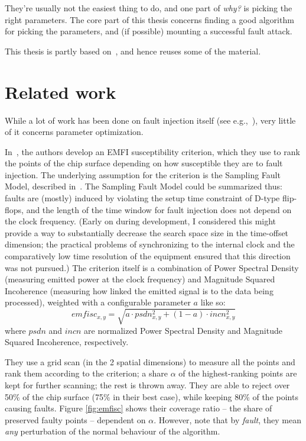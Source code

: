\documentclass[times, utf8, diplomski]{fer}
\begin{document}
They're usually not the easiest thing to do, and one part of \emph{why?} is
picking the right parameters. The core part of this thesis concerns finding
a good algorithm for picking the parameters, and (if possible) mounting a
successful fault attack.


This thesis is partly based on~\cite{paper_FDTC2018}, and hence reuses some
of the material.


\section{Related work}\label{sec:related_work}
While a lot of work has been done on fault injection itself (see
e.g.,~\cite{Kommerling, boneh_demillo_lipton, nsamwel_africacrypt, impeccable_circuits, FI_crowbars}),
very little of it concerns parameter optimization.

In~\cite{madau2017fault}, the authors develop an EMFI susceptibility criterion,
which they use to rank the points of the chip surface depending on how susceptible
they are to fault injection. The underlying assumption for the criterion is the
Sampling Fault Model, described in~\cite{ordas2015injection}. The Sampling Fault
Model could be summarized thus: faults are (mostly) induced by violating the
setup time constraint of D-type flip-flops, and the length of the time window
for fault injection does not depend on the clock frequency. (Early on during
development, I considered this might provide a way to substantially decrease
the search space size in the time-offset dimension; the practical problems of
synchronizing to the internal clock and the comparatively low time resolution
of the equipment ensured that this direction was not pursued.) The criterion
itself is a combination of Power Spectral Density (measuring emitted power at
the clock frequency) and Magnitude Squared Incoherence (measuring how linked
the emitted signal is to the data being processed), weighted with a configurable
parameter $a$ like so:
\[
    emfisc_{x,y} = \sqrt{a \cdot psdn_{x,y}^2   +   (1-a) \cdot incn_{x,y}^2}
\]
where $psdn$ and $incn$ are normalized Power Spectral Density and Magnitude
Squared Incoherence, respectively.


They use a grid scan (in the 2 spatial dimensions) to measure all the points
and rank them according to the criterion; a share $\alpha$ of the highest-ranking
points are kept for further scanning; the rest is thrown away.
They are able to reject over 50\% of the chip surface (75\% in their best case),
while keeping 80\% of the points causing faults. Figure \ref{fig:emfisc} shows
their coverage ratio -- the share of preserved faulty points -- dependent on $\alpha$.
However, note that by \emph{fault}, they mean \emph{any} perturbation of the
normal behaviour of the algorithm.
\end{document}
